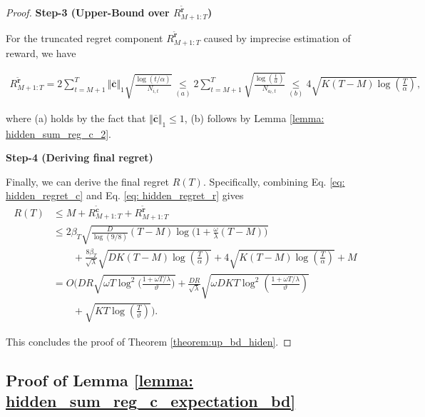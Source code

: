 \begin{proof}
\textbf{Step-3 (Upper-Bound over $R_{M+1:T}^{\tilde{\boldsymbol{r}}}$)}

For the truncated regret component $R_{M+1:T}^{\tilde{\boldsymbol{r}}}$ caused by imprecise estimation of reward, we have

\begin{equation}
\label{eq: hidden_regret_r}
\begin{aligned}
R_{M+1:T}^{\tilde{\boldsymbol{r}}}
= 
2 \sum_{t=M+1}^{T} \Vert\boldsymbol{\overline{c}}\Vert_1 \sqrt{\frac{ \log(t/\alpha)}{N_{i,t}}}
\underset{(a)}{\leq}
2 \sum_{t=M+1}^{T} \sqrt{\frac{ \log \left( \frac{t}{\alpha} \right)}{N_{a_t,t}}} 
\underset{(b)}{\leq}
4 \sqrt{ K (T-M) \log \left( \frac{T}{\alpha} \right)},
\end{aligned}
\end{equation}

where (a) holds by the fact that $\Vert \boldsymbol{\overline{c}}\Vert_1 \leq 1$, (b) follows by Lemma \ref{lemma: hidden_sum_reg_c_2}.

\textbf{Step-4 (Deriving final regret)}

Finally, we can derive the final regret $R(T)$.
Specifically, combining Eq. \ref{eq: hidden_regret_c} and Eq. \ref{eq: hidden_regret_r} gives
\[
\begin{aligned}
R(T) 
& \leq 
M +
R_{M+1:T}^{\tilde{\boldsymbol{c}}} +
R_{M+1:T}^{\tilde{\boldsymbol{r}}} \\
& \leq
2\beta_T \sqrt{\frac{D}{\log(9/8)} (T-M) \log \Big( 1 + \frac{\omega}{\lambda} (T-M) \Big) } \\
& \qquad +
\frac{8\beta_T}{\sqrt{\lambda}}
\sqrt{ DK(T-M) \log \left( \frac{T}{\alpha} \right)}
+
4 \sqrt{ K (T-M) \log \left( \frac{T}{\alpha} \right)}
+ M \\
& =
O\Bigg(
DR \sqrt{ \omega T \log^{2} \Big( \frac{1 + \omega T/\lambda}{\vartheta} \Big)}
+
\frac{DR}{\sqrt{\lambda}} \sqrt{ \omega DK T \log^2 \left(\frac{1 + \omega T/\lambda}{\vartheta} \right)} \\
& \qquad + 
\sqrt{ KT \log \left( \frac{T}{\vartheta} \right)}
\Bigg).
\end{aligned}
\]

This concludes the proof of Theorem \ref{theorem:up_bd_hiden}.
\end{proof}




\subsection{Proof of Lemma \ref{lemma: hidden_sum_reg_c_expectation_bd}}
\label{sec: proof_lemma_hidden_sum_reg_c_expectation_bd}

